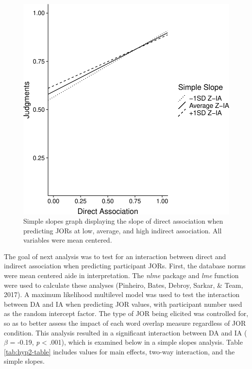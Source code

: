 \documentclass[english,,man]{apa6}
\begin{document}
\begin{figure}
\centering
\includegraphics{max_buch_JOL_files/figure-latex/hyp2graph-1.pdf}
\caption{\label{fig:hyp2graph}Simple slopes graph displaying the slope of direct association when predicting JORs at low, average, and high indirect association. All variables were mean centered.}
\end{figure}

The goal of next analysis was to test for an interaction between direct and indirect association when predicting participant JORs. First, the database norms were mean centered aide in interpretation. The \emph{nlme} package and \emph{lme} function were used to calculate these analyses (Pinheiro, Bates, Debroy, Sarkar, \& Team, 2017). A maximum likelihood multilevel model was used to test the interaction between DA and IA when predicting JOR values, with participant number used as the random intercept factor. The type of JOR being elicited was controlled for, so as to better assess the impact of each word overlap measure regardless of JOR condition. This analysis resulted in a significant interaction between DA and IA (\(\beta\) = -0.19, \emph{p} \textless{} .001), which is examined below in a simple slopes analysis. Table \ref{tab:hyp2-table} includes values for main effects, two-way interaction, and the simple slopes.
\end{document}
